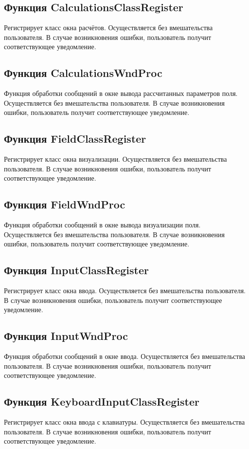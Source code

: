\documentclass[14pt,a4paper,final]{extreport}
\begin{document}
\subsection{Функция CalculationsClassRegister}
Регистрирует класс окна расчётов. Осуществляется без вмешательства пользователя. 
В случае возникновения ошибки, пользователь получит соответствующее уведомление.

\subsection{Функция CalculationsWndProc}
Функция обработки сообщений в окне вывода рассчитанных параметров поля. Осуществляется без вмешательства пользователя. 
В случае возникновения ошибки, пользователь получит соответствующее уведомление.

\subsection{Функция FieldClassRegister}
Регистрирует класс окна визуализации. Осуществляется без вмешательства пользователя. 
В случае возникновения ошибки, пользователь получит соответствующее уведомление.

\subsection{Функция FieldWndProc}
Функция обработки сообщений в окне вывода визуализации поля. Осуществляется без вмешательства пользователя. 
В случае возникновения ошибки, пользователь получит соответствующее уведомление.

\subsection{Функция InputClassRegister}
Регистрирует класс окна ввода. Осуществляется без вмешательства пользователя. 
В случае возникновения ошибки, пользователь получит соответствующее уведомление.

\subsection{Функция InputWndProc}
Функция обработки сообщений в окне ввода. Осуществляется без вмешательства пользователя. 
В случае возникновения ошибки, пользователь получит соответствующее уведомление.

\subsection{Функция KeyboardInputClassRegister}
Регистрирует класс окна ввода с клавиатуры. Осуществляется без вмешательства пользователя. 
В случае возникновения ошибки, пользователь получит соответствующее уведомление.
\end{document}
